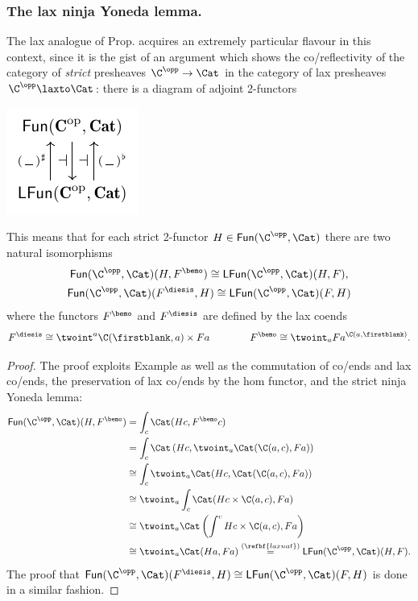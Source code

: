 \subsubsection{\bf The lax ninja Yoneda lemma.}\label{laxyonedaninja} The lax analogue of Prop\@.  acquires an extremely particular flavour in this context, since it is the gist of an argument which shows the co/reflectivity of the category of \emph{strict} presheaves $\C^\opp\to \Cat$ in the category of lax presheaves $\C^\opp\laxto \Cat$: there is a diagram of adjoint 2-functors
\begin{center}
\includegraphics[scale=1]{figures/fig8}
\end{center}
This means that for each strict 2-functor $H\in \textsf{Fun}(\C^\opp, \Cat)$ there are two natural isomorphisms
\begin{gather}
\textsf{Fun}(\C^\opp, \Cat)(H, F^\bemo) \cong \textsf{LFun}(\C^\opp, \Cat)(H,F),\notag \\
\textsf{Fun}(\C^\opp, \Cat)(F^\diesis, H)\cong \textsf{LFun}(\C^\opp, \Cat)(F,H)
\end{gather}
where the functors $F^\bemo$ and $F^\diesis$ are defined by the lax coends
\[
F^\diesis \cong \twoint^a \C(\firstblank,a)\times Fa \qquad\qquad
F^\bemo \cong \twoint_a Fa^{\C(a,\firstblank)}.
\]
\begin{proof}
The proof exploits Example  as well as the commutation of co/ends and lax co/ends, the preservation of lax co/ends by the hom functor, and the strict ninja Yoneda lemma:
 \begin{align*}
 \textsf{Fun}(\C^\opp,\Cat)(H, F^\bemo) & = \int_c \Cat(Hc, F^\bemo c) \\
& = \int_c \Cat \left(Hc, \twoint_a \Cat(\C(a,c), Fa) \right)\\
 & \cong \int_c \twoint_a \Cat(Hc, \Cat(\C(a,c), Fa)) \\
 & \cong \twoint_a \int_c \Cat(Hc\times \C(a,c), Fa) \\
 & \cong \twoint_a \Cat\left( \int^c Hc \times \C(a,c), Fa \right)\\
 & \cong \twoint_a \Cat(Ha, Fa) \overset{(\refbf{laxnat})}= \textsf{LFun}(\C^\opp, \Cat)(H,F).
 \end{align*}
The proof that $\textsf{Fun}(\C^\opp, \Cat)(F^\diesis, H)\cong \textsf{LFun}(\C^\opp, \Cat)(F,H)$ is done in a similar fashion.
\end{proof}
